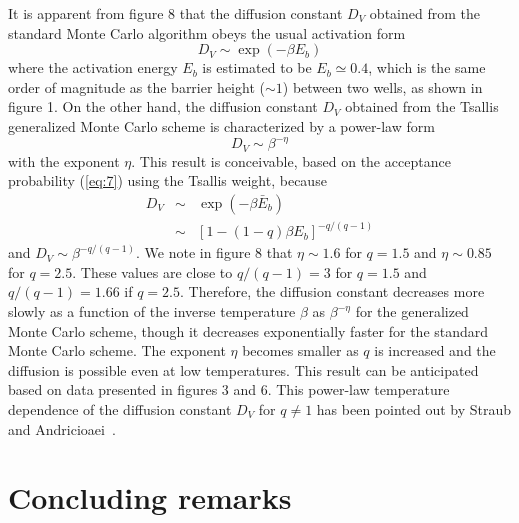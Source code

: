 It is apparent from figure 8 that the diffusion constant $D_{V}$ obtained
from the standard Monte Carlo algorithm obeys the usual activation form
\begin{equation}
D_{V} \sim \exp\left(-\beta E_{b}\right)
\label{eq:21}
\end{equation}
where the activation energy $E_{b}$ is estimated to be $E_{b}\simeq 0.4$,
which is the same order of magnitude as the barrier height ($\sim 1$)
between two wells, as shown in figure 1. On the other hand, the
diffusion
constant $D_{V}$ obtained from the Tsallis generalized Monte Carlo scheme is
characterized by a power-law form
\begin{equation}
D_{V} \sim \beta^{-\eta}
\label{eq:22}
\end{equation}
with the exponent $\eta$. This result is conceivable, based on the
acceptance
probability (\ref{eq:7}) using the Tsallis weight, because
\begin{eqnarray}
D_{V} &\sim& \exp(-\beta\bar{E}_{b})
\nonumber \\
&\sim& \left[1-(1-q)\beta E_{b} \right]^{-q/(q-1)}
\label{eq:23}
\end{eqnarray}
and $D_{V}\sim \beta^{-q/(q-1)}$. We note in figure 8 that $\eta\sim 1.6$
for $q=1.5$ and $\eta\sim 0.85$
for $q=2.5$. These values are close to $q/(q-1)=3$ for $q=1.5$ and
$q/(q-1)=1.66$ if $q=2.5$. Therefore, the diffusion constant decreases
more slowly as a function of the inverse temperature $\beta$ as
$\beta^{-\eta}$ for the
generalized Monte Carlo scheme, though it decreases exponentially
faster for
the standard Monte Carlo scheme. The exponent $\eta$ becomes smaller as
$q$ is increased and the diffusion is possible even at low temperatures.
This result can be anticipated based on data presented in figures 3
and 6. This power-law temperature dependence of the diffusion constant
$D_{V}$ for $q\neq 1$ has been pointed out by Straub and
Andricioaei~\cite{SA2}.

\section{Concluding remarks}

